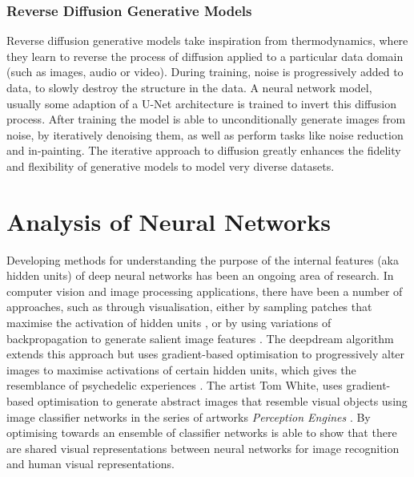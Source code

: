 \subsubsection{Reverse Diffusion Generative Models}
\label{c2:subsubsec:diffusion}

Reverse diffusion generative models take inspiration from thermodynamics, where they learn to reverse the process of diffusion applied to a particular data domain \citep{sohl2015deep} (such as images, audio or video). 
During training, noise is progressively added to data, to slowly destroy the structure in the data.
A neural network model, usually some adaption of a U-Net architecture \citep{ronneberger2015u} is trained to invert this diffusion process.
After training the model is able to unconditionally generate images from noise, by iteratively denoising them, as well as perform tasks like noise reduction and in-painting. 
The iterative approach to diffusion greatly enhances the fidelity and flexibility of generative models to model very diverse datasets.

\section{Analysis of Neural Networks} 

Developing methods for understanding the purpose of the internal features (aka hidden units) of deep neural networks has been an ongoing area of research. 
In computer vision and image processing applications, there have been a number of approaches, such as through visualisation, either by sampling patches that maximise the activation of hidden units \cite{zeiler2014visualizing, zhou2014object}, or by using variations of backpropagation to generate salient image features \cite{zeiler2014visualizing, simonyan2013deep}. 
The deepdream algorithm \citep{mordvintsev2015inceptionism} extends this approach but uses gradient-based optimisation to progressively alter images to maximise activations of certain hidden units, which gives the resemblance of psychedelic experiences \citep{suzuki2017deep}.
The artist Tom White, uses gradient-based optimisation to generate abstract images that resemble visual objects using image classifier networks in the series of artworks \textit{Perception Engines} \citep{white2018perception}.
By optimising towards an ensemble of classifier networks \cite{white2019shared} is able to show that there are shared visual representations between neural networks for image recognition and human visual representations.

